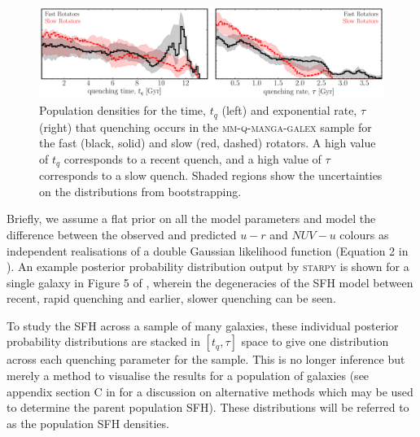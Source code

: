 \documentclass[useAMS,usenatbib]{mn2e}
\begin{document}
\begin{figure}
\centering
\includegraphics[width=\textwidth]{../figures/quenching_time_rate_FR_SR_nonkdc_MM_NSF_1sigma_C16_VOR10.pdf}
\caption{Population densities for the time, $t_q$ (left) and exponential rate, $\tau$ (right) that quenching occurs in the \textsc{mm-q-manga-galex} sample for the fast (black, solid) and slow (red, dashed) rotators. A high value of $t_q$ corresponds to a recent quench, and a high value of $\tau$ corresponds to a slow quench. Shaded regions show the uncertainties on the distributions from bootstrapping. %
}
\label{fig:popfrvsr}
\end{figure}

Briefly, we assume a flat prior on all the model parameters and model the difference between the observed and predicted $u-r$ and $NUV-u$ colours as independent realisations of a double Gaussian likelihood function (Equation 2 in \citealt{smethurst15}). An example posterior probability distribution output by \textsc{starpy} is shown for a single galaxy in Figure 5 of \cite{smethurst15}, wherein the degeneracies of the SFH model between recent, rapid quenching and earlier, slower quenching can be seen.

To study the SFH across a sample of many galaxies, these individual posterior probability distributions are stacked in $[t_q, \tau]$ space to give one distribution across each quenching parameter for the sample. This is no longer inference but merely a method to visualise the results for a population of galaxies (see appendix section C in \citealt{smethurst16} for a discussion on alternative methods which may be used to determine the parent population SFH). These distributions will be referred to as the population SFH densities.
\end{document}
